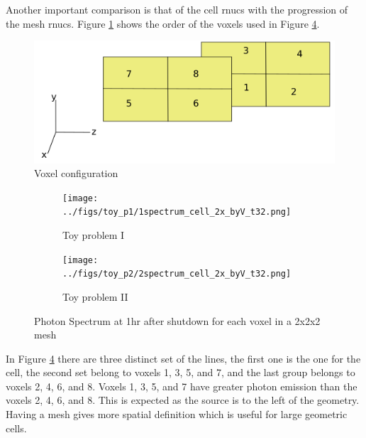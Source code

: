 Another important comparison is that of the cell rnucs with the progression of the mesh rnucs. 
Figure \ref{voxels} shows the order of the voxels used in Figure \ref{spect_cell_2x_byV}. 


\begin{figure}[h]
\begin{centering}
\includegraphics[width=0.60\linewidth]{../figs/voxels.png}
\caption{Voxel configuration}
\label{voxels}
\end{centering}
\end{figure}

\begin{figure}[h]
 \begin{centering}
 \centering
 \begin{subfigure}[b]{.45\textwidth}
 \texttt{[image: ../figs/toy\_p1/1spectrum\_cell\_2x\_byV\_t32.png]}
 \caption{Toy problem I }
 \label{1spect_cell_2x_byV}
 \end{subfigure}
 \hspace{0.05cm}
 \begin{subfigure}[b]{.45\textwidth}
 \centering
 \texttt{[image: ../figs/toy\_p2/2spectrum\_cell\_2x\_byV\_t32.png]}
 \caption{Toy problem II}
 \label{2spect_cell_2x_byV}
 \end{subfigure}
 \caption{Photon Spectrum at 1hr after shutdown for each voxel in a 2x2x2 mesh}
 \label{spect_cell_2x_byV}
 \end{centering}
\end{figure}

In Figure \ref{spect_cell_2x_byV} there are three distinct set of the lines, the 
first one is the one for the cell, the second set belong to voxels 1, 3, 5, and 7, and the 
last group belongs to voxels 2, 4, 6, and 8. Voxels 1, 3, 5, and 7 have greater photon emission 
than the voxels 2, 4, 6, and 8. This is expected as the source is to the left of the geometry. 
Having a mesh gives more spatial definition which is useful for large geometric cells. 
